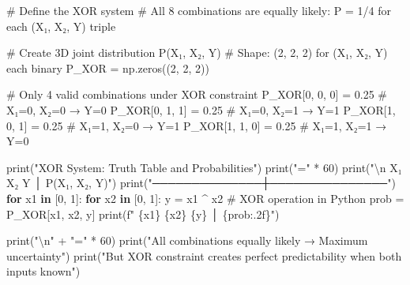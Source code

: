 \documentclass[
  11pt,
  letterpaper,
  oneside,
  openany]{book}
\newenvironment{Shaded}{\begin{snugshade}}{\end{snugshade}}
\newcommand{\BuiltInTok}[1]{\textcolor[rgb]{0.00,0.23,0.31}{#1}}
\newcommand{\CharTok}[1]{\textcolor[rgb]{0.13,0.47,0.30}{#1}}
\newcommand{\CommentTok}[1]{\textcolor[rgb]{0.37,0.37,0.37}{#1}}
\newcommand{\ControlFlowTok}[1]{\textcolor[rgb]{0.00,0.23,0.31}{\textbf{#1}}}
\newcommand{\DecValTok}[1]{\textcolor[rgb]{0.68,0.00,0.00}{#1}}
\newcommand{\FloatTok}[1]{\textcolor[rgb]{0.68,0.00,0.00}{#1}}
\newcommand{\KeywordTok}[1]{\textcolor[rgb]{0.00,0.23,0.31}{\textbf{#1}}}
\newcommand{\NormalTok}[1]{\textcolor[rgb]{0.00,0.23,0.31}{#1}}
\newcommand{\OperatorTok}[1]{\textcolor[rgb]{0.37,0.37,0.37}{#1}}
\newcommand{\SpecialCharTok}[1]{\textcolor[rgb]{0.37,0.37,0.37}{#1}}
\newcommand{\SpecialStringTok}[1]{\textcolor[rgb]{0.13,0.47,0.30}{#1}}
\newcommand{\StringTok}[1]{\textcolor[rgb]{0.13,0.47,0.30}{#1}}
\begin{document}
\begin{Shaded}
\begin{Highlighting}[]
\CommentTok{\# Define the XOR system}
\CommentTok{\# All 8 combinations are equally likely: P = 1/4 for each (X₁, X₂, Y) triple}

\CommentTok{\# Create 3D joint distribution P(X₁, X₂, Y)}
\CommentTok{\# Shape: (2, 2, 2) for (X₁, X₂, Y) each binary}
\NormalTok{P\_XOR }\OperatorTok{=}\NormalTok{ np.zeros((}\DecValTok{2}\NormalTok{, }\DecValTok{2}\NormalTok{, }\DecValTok{2}\NormalTok{))}

\CommentTok{\# Only 4 valid combinations under XOR constraint}
\NormalTok{P\_XOR[}\DecValTok{0}\NormalTok{, }\DecValTok{0}\NormalTok{, }\DecValTok{0}\NormalTok{] }\OperatorTok{=} \FloatTok{0.25}  \CommentTok{\# X₁=0, X₂=0 → Y=0}
\NormalTok{P\_XOR[}\DecValTok{0}\NormalTok{, }\DecValTok{1}\NormalTok{, }\DecValTok{1}\NormalTok{] }\OperatorTok{=} \FloatTok{0.25}  \CommentTok{\# X₁=0, X₂=1 → Y=1}
\NormalTok{P\_XOR[}\DecValTok{1}\NormalTok{, }\DecValTok{0}\NormalTok{, }\DecValTok{1}\NormalTok{] }\OperatorTok{=} \FloatTok{0.25}  \CommentTok{\# X₁=1, X₂=0 → Y=1}
\NormalTok{P\_XOR[}\DecValTok{1}\NormalTok{, }\DecValTok{1}\NormalTok{, }\DecValTok{0}\NormalTok{] }\OperatorTok{=} \FloatTok{0.25}  \CommentTok{\# X₁=1, X₂=1 → Y=0}

\BuiltInTok{print}\NormalTok{(}\StringTok{"XOR System: Truth Table and Probabilities"}\NormalTok{)}
\BuiltInTok{print}\NormalTok{(}\StringTok{"="} \OperatorTok{*} \DecValTok{60}\NormalTok{)}
\BuiltInTok{print}\NormalTok{(}\StringTok{"}\CharTok{\textbackslash{}n}\StringTok{ X₁   X₂   Y   │  P(X₁, X₂, Y)"}\NormalTok{)}
\BuiltInTok{print}\NormalTok{(}\StringTok{"──────────────┼───────────────"}\NormalTok{)}
\ControlFlowTok{for}\NormalTok{ x1 }\KeywordTok{in}\NormalTok{ [}\DecValTok{0}\NormalTok{, }\DecValTok{1}\NormalTok{]:}
    \ControlFlowTok{for}\NormalTok{ x2 }\KeywordTok{in}\NormalTok{ [}\DecValTok{0}\NormalTok{, }\DecValTok{1}\NormalTok{]:}
\NormalTok{        y }\OperatorTok{=}\NormalTok{ x1 }\OperatorTok{\^{}}\NormalTok{ x2  }\CommentTok{\# XOR operation in Python}
\NormalTok{        prob }\OperatorTok{=}\NormalTok{ P\_XOR[x1, x2, y]}
        \BuiltInTok{print}\NormalTok{(}\SpecialStringTok{f"  }\SpecialCharTok{\{}\NormalTok{x1}\SpecialCharTok{\}}\SpecialStringTok{    }\SpecialCharTok{\{}\NormalTok{x2}\SpecialCharTok{\}}\SpecialStringTok{   }\SpecialCharTok{\{}\NormalTok{y}\SpecialCharTok{\}}\SpecialStringTok{  │    }\SpecialCharTok{\{}\NormalTok{prob}\SpecialCharTok{:.2f\}}\SpecialStringTok{"}\NormalTok{)}

\BuiltInTok{print}\NormalTok{(}\StringTok{"}\CharTok{\textbackslash{}n}\StringTok{"} \OperatorTok{+} \StringTok{"="} \OperatorTok{*} \DecValTok{60}\NormalTok{)}
\BuiltInTok{print}\NormalTok{(}\StringTok{"All combinations equally likely → Maximum uncertainty"}\NormalTok{)}
\BuiltInTok{print}\NormalTok{(}\StringTok{"But XOR constraint creates perfect predictability when both inputs known"}\NormalTok{)}
\end{Highlighting}
\end{Shaded}
\end{document}
